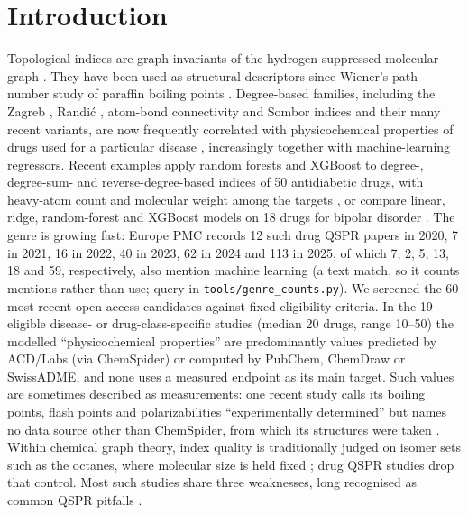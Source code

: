 \documentclass[preprint,12pt]{elsarticle}
\begin{document}

\section{Introduction}

Topological indices are graph invariants of the hydrogen-suppressed molecular graph \cite{todeschini2009}. They have been used as structural descriptors since Wiener's path-number study of paraffin boiling points \cite{wiener1947}. Degree-based families, including the Zagreb \cite{gutman1972}, Randi\'c \cite{randic1975}, atom-bond connectivity \cite{estrada1998} and Sombor \cite{gutman2021sombor} indices and their many recent variants, are now frequently correlated with physicochemical properties of drugs used for a particular disease \cite{almulla2026antifungal}, increasingly together with machine-learning regressors. Recent examples apply random forests and XGBoost to degree-, degree-sum- and reverse-degree-based indices of 50 antidiabetic drugs, with heavy-atom count and molecular weight among the targets \cite{pandian2026antidiabetic}, or compare linear, ridge, random-forest and XGBoost models on 18 drugs for bipolar disorder \cite{colakoglu2026bipolar}. The genre is growing fast: Europe PMC records 12 such drug QSPR papers in 2020, 7 in 2021, 16 in 2022, 40 in 2023, 62 in 2024 and 113 in 2025, of which 7, 2, 5, 13, 18 and 59, respectively, also mention machine learning (a text match, so it counts mentions rather than use; query in \texttt{tools/genre\_counts.py}). We screened the 60 most recent open-access candidates against fixed eligibility criteria. In the 19 eligible disease- or drug-class-specific studies (median 20 drugs, range 10--50) the modelled ``physicochemical properties'' are predominantly values predicted by ACD/Labs (via ChemSpider) or computed by PubChem, ChemDraw or SwissADME, and none uses a measured endpoint as its main target. Such values are sometimes described as measurements: one recent study calls its boiling points, flash points and polarizabilities ``experimentally determined'' but names no data source other than ChemSpider, from which its structures were taken \cite{mufti2026classes}. Within chemical graph theory, index quality is traditionally judged on isomer sets such as the octanes, where molecular size is held fixed \cite{gutman2013testing,furtula2013structure}; drug QSPR studies drop that control. Most such studies share three weaknesses, long recognised as common QSPR pitfalls \cite{topliss1979chance,golbraikh2002beware,dearden2009,tropsha2010best,cherkasov2014qsar}.
\end{document}
